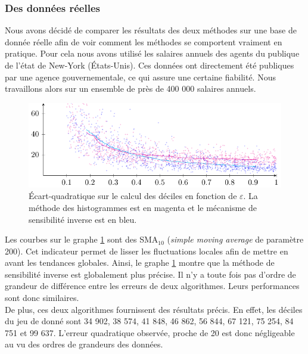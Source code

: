 \subsubsection{Des données réelles}

Nous avons décidé de comparer les résultats des deux méthodes sur une base de donnée réelle \cite{salaries} afin de voir comment les méthodes se comportent vraiment en pratique. Pour cela nous avons utilisé les salaires annuels des agents du publique de l'état de New-York (États-Unis). Ces données ont directement été publiques par une agence gouvernementale, ce qui assure une certaine fiabilité. Nous travaillons alors sur un ensemble de près de 400 000 salaires annuels.

\begin{figure}[H]
    \centering
    \includegraphics[clip]{"./proofs/figures/cdoRBCZD8XdSJKfP.pdf"}
    \caption{Écart-quadratique sur le calcul des déciles en fonction de \(\varepsilon\). La méthode des histogrammes est en {\color{magenta} magenta} et le mécanisme de sensibilité inverse est en {\color{blue} bleu}.}
    \label{fig2}
\end{figure}

Les courbes sur le graphe \ref{fig2} sont des SMA\(_{10}\) (\textit{simple moving average} de paramètre 200). Cet indicateur permet de lisser les fluctuations locales afin de mettre en avant les tendances globales. Ainsi, le graphe \ref{fig2} montre que la méthode de sensibilité inverse est globalement plus précise. Il n'y a toute fois pas d'ordre de grandeur de différence entre les erreurs de deux algorithmes. Leurs performances sont donc similaires.\\

De plus, ces deux algorithmes fournissent des résultats précis. En effet, les déciles du jeu de donné sont 34 902, 38 574, 41 848, 46 862, 56 844, 67 121, 75 254, 84 751 et 99 637. L'erreur quadratique observée, proche de 20 est donc négligeable au vu des ordres de grandeurs des données.\\

